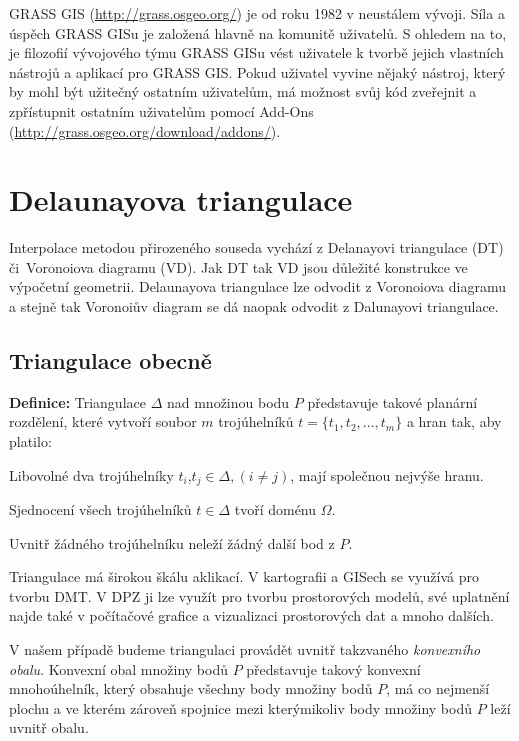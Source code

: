 \documentclass[12pt,a4paper]{article}
\begin{document}
GRASS GIS (\url{http://grass.osgeo.org/}) je od roku 1982 v neustálem vývoji. Síla a úspěch GRASS GISu
je založená hlavně na komunitě uživatelů. S ohledem na to, je
filozofií vývojového týmu GRASS GISu vést uživatele k tvorbě jejich
vlastních nástrojů a aplikací pro GRASS GIS. Pokud uživatel vyvine
nějaký nástroj, který by mohl být užitečný ostatním uživatelům, má
možnost svůj kód zveřejnit a zpřístupnit ostatním uživatelům pomocí
Add-Ons (\url{http://grass.osgeo.org/download/addons/}).

\newpage
\section{Delaunayova triangulace}

Interpolace metodou přirozeného souseda vychází z Delanayovi
triangulace (DT) či~Voronoiova diagramu (VD). Jak DT tak VD jsou důležité
konstrukce ve výpočetní geometrii. Delaunayova triangulace lze odvodit
z Voronoiova diagramu a stejně tak Voronoiův diagram se dá naopak
odvodit z Dalunayovi triangulace.

\subsection{Triangulace obecně}
\textbf{Definice\cite{TB1}:} Triangulace $\Delta$ nad množinou bodu
$P$ představuje takové planární rozdělení, které vytvoří soubor $m$
trojúhelníků $t = \{ t_1, t_2,...,t_m \}$ a hran tak, aby platilo:

Libovolné dva trojúhelníky $t_i$,$t_j \in \Delta, (i \neq j)$, mají
společnou nejvýše hranu.

Sjednocení všech trojúhelníků $t \in \Delta$ tvoří doménu $\Omega$.

Uvnitř žádného trojúhelníku neleží žádný další bod z $P$.

\bigskip

Triangulace má širokou škálu aklikací. V kartografii a GISech se
využívá pro tvorbu DMT. V DPZ ji lze využít pro tvorbu prostorových
modelů, své uplatnění najde také v počítačové grafice a vizualizaci
prostorových dat a mnoho dalších.

V našem případě budeme triangulaci provádět uvnitř takzvaného
\emph{konvexního obalu}. Konvexní obal množiny bodů $P$ představuje
takový konvexní mnohoúhelník, který obsahuje všechny body množiny bodů
$P$, má co nejmenší plochu a ve kterém zároveň spojnice mezi
kterýmikoliv body množiny bodů $P$ leží uvnitř obalu.
\end{document}
